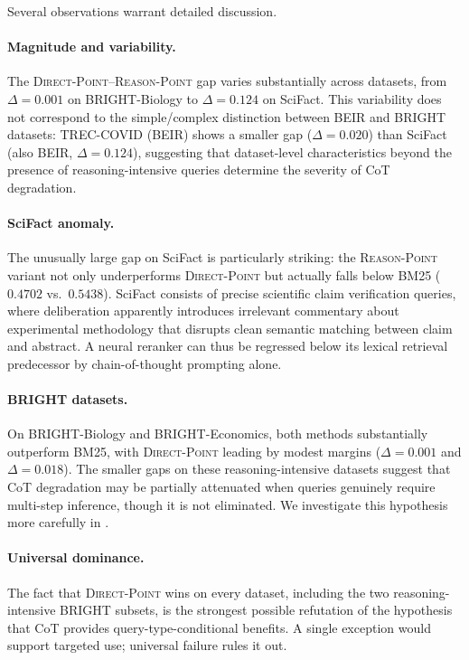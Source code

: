 \documentclass[12pt]{article}
\newcommand{\direct}{\textsc{Direct-Point}}
\newcommand{\reason}{\textsc{Reason-Point}}
\newcommand{\CoT}{CoT}
\begin{document}
Several observations warrant detailed discussion.

\paragraph{Magnitude and variability.}
The \direct{}--\reason{} gap varies substantially across datasets, from
$\Delta=0.001$ on BRIGHT-Biology to $\Delta=0.124$ on SciFact.  This
variability does not correspond to the simple/complex distinction between
BEIR and BRIGHT datasets: TREC-COVID (BEIR) shows a smaller gap ($\Delta=0.020$)
than SciFact (also BEIR, $\Delta=0.124$), suggesting that dataset-level
characteristics beyond the presence of reasoning-intensive queries determine
the severity of \CoT{} degradation.

\paragraph{SciFact anomaly.}
The unusually large gap on SciFact is particularly striking: the \reason{}
variant not only underperforms \direct{} but actually falls below BM25
($0.4702$ vs.\ $0.5438$).  SciFact consists of precise scientific claim
verification queries, where deliberation apparently introduces irrelevant
commentary about experimental methodology that disrupts clean semantic matching
between claim and abstract.  A neural reranker can thus be regressed below its
lexical retrieval predecessor by chain-of-thought prompting alone.

\paragraph{BRIGHT datasets.}
On BRIGHT-Biology and BRIGHT-Economics, both methods substantially outperform
BM25, with \direct{} leading by modest margins ($\Delta=0.001$ and
$\Delta=0.018$).  The smaller gaps on these reasoning-intensive datasets
suggest that \CoT{} degradation may be partially attenuated when queries
genuinely require multi-step inference, though it is not eliminated.  We
investigate this hypothesis more carefully in .

\paragraph{Universal dominance.}
The fact that \direct{} wins on every dataset, including the two reasoning-intensive
BRIGHT subsets, is the strongest possible refutation of the hypothesis that
\CoT{} provides query-type-conditional benefits.  A single exception would
support targeted use; universal failure rules it out.
\end{document}
